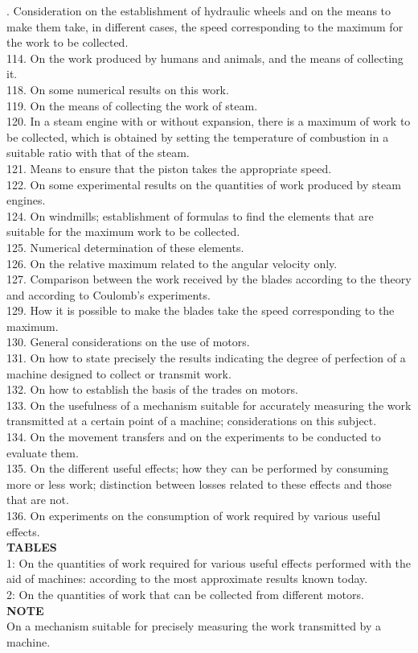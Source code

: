 \documentclass{book}
\begin{document}
. Consideration on the establishment of hydraulic wheels and on the means to make them take, in different cases, the speed corresponding to the maximum for the work to be collected. \\
114. On the work produced by humans and animals, and the means of collecting it. \\
118. On some numerical results on this work. \\
119. On the means of collecting the work of steam. \\
120. In a steam engine with or without expansion, there is a maximum of work to be collected, which is obtained by setting the temperature of combustion in a suitable ratio with that of the steam. \\
121. Means to ensure that the piston takes the appropriate speed. \\
122. On some experimental results on the quantities of work produced by steam engines. \\
124. On windmills; establishment of formulas to find the elements that are suitable for the maximum work to be collected. \\
125. Numerical determination of these elements. \\
126. On the relative maximum related to the angular velocity only. \\
127. Comparison between the work received by the blades according to the theory and according to Coulomb's experiments. \\
129. How it is possible to make the blades take the speed corresponding to the maximum. \\
130. General considerations on the use of motors. \\
131. On how to state precisely the results indicating the degree of perfection of a machine designed to collect or transmit work. \\
132. On how to establish the basis of the trades on motors. \\
133. On the usefulness of a mechanism suitable for accurately measuring the work transmitted at a certain point of a machine; considerations on this subject. \\
134. On the movement transfers and on the experiments to be conducted to evaluate them. \\
135. On the different useful effects; how they can be performed by consuming more or less work; distinction between losses related to these effects and those that are not. \\
136. On experiments on the consumption of work required by various useful effects. \\
\textbf{TABLES} \\
1: On the quantities of work required for various useful effects performed with the aid of machines: according to the most approximate results known today. \\
2: On the quantities of work that can be collected from different motors. \\
\textbf{NOTE} \\
On a mechanism suitable for precisely measuring the work transmitted by a machine.
\end{document}
